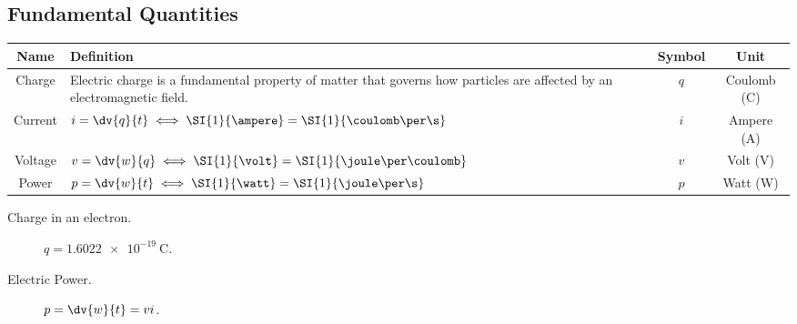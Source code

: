 \documentclass{article}
\begin{document}
\subsection{Fundamental Quantities}
\begingroup
\renewcommand{\arraystretch}{1.5}
\begin{table}[H]
    \centering
    \begin{tabular}{c | >{\centering}p{} | c | c}
        \toprule
        \textbf{Name} & \textbf{Definition}                                                                                                      & \textbf{Symbol}           & \textbf{Unit} \\
        \midrule
        Charge        & Electric charge is a fundamental property of matter that governs how particles are affected by an electromagnetic field.
                      & $q$                                                                                                                      & Coulomb (\unit{\coulomb})                 \\
        \hline
        Current       & $\displaystyle i = \dv{q}{t}\iff\SI{1}{\ampere} = \SI{1}{\coulomb\per\s}$
                      & $i$                                                                                                                      & Ampere (\unit{\ampere})                   \\
        \hline
        Voltage       & $\displaystyle v = \dv{w}{q}\iff\SI{1}{\volt} = \SI{1}{\joule\per\coulomb}$
                      & $v$                                                                                                                      & Volt (\unit{\volt})                       \\
        \hline
        Power         & $\displaystyle p = \dv{w}{t}\iff\SI{1}{\watt} = \SI{1}{\joule\per\s}$
                      & $p$                                                                                                                      & Watt (\unit{\watt})                       \\
        \bottomrule
    \end{tabular}
\end{table}
\endgroup
\begin{description}
    \item[Charge in an electron.] $q = \SI{1.6022e-19}{\coulomb}$.
    \item[Electric Power.] $\displaystyle p = \dv{w}{t} = vi$.
\end{description}
\end{document}
